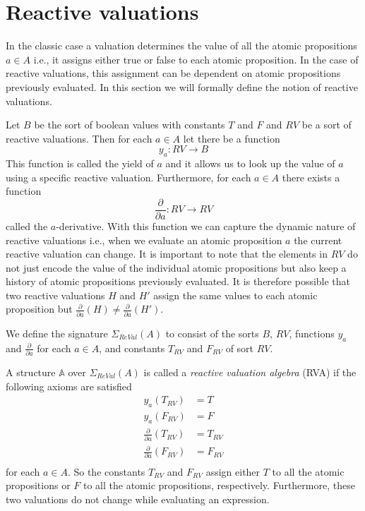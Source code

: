 \documentclass[a4paper,twoside,openright]{report}
\newcommand{\dd}[1]{\frac{\partial}{\partial #1}}
\begin{document}
\section{Reactive valuations}
In the classic case a valuation determines the value of all the atomic propositions $a\in A$ i.e., it assigns either true or false to each atomic proposition. In the case of reactive valuations, this assignment can be dependent on atomic propositions previously evaluated. In this section we will formally define the notion of reactive valuations.

Let $B$ be the sort of boolean values with constants $T$ and $F$ and $RV$ be a sort of reactive valuations. Then for each $a\in A$ let there be a function
\[
y_a:RV\to B
\]
This function is called the yield of $a$ and it allows us to look up the value of $a$ using a specific reactive valuation. Furthermore, for each $a\in A$ there exists a function
\[
\dd a:RV\to RV
\]
called the $a$-derivative. With this function we can capture the dynamic nature of reactive valuations i.e., when we evaluate an atomic proposition $a$ the current reactive valuation can change. It is important to note that the elements in $RV$ do not just encode the value of the individual atomic propositions but also keep a history of atomic propositions previously evaluated. It is therefore possible that two reactive valuations $H$ and $H'$ assign the same values to each atomic proposition but $\dd a(H)\ne \dd a(H')$.

We define the signature $\Sigma_{ReVal}(A)$ to consist of the sorts $B$, $RV$, functions $y_a$ and $\dd a$ for each $a\in A$, and constants $T_{RV}$ and $F_{RV}$ of sort $RV$.

A structure $\mathbb{A}$ over $\Sigma_{ReVal}(A)$ is called a \emph{reactive valuation algebra} (RVA) if the following axioms are satisfied
\begin{align*}
y_a(T_{RV}) &= T\\
y_a(F_{RV}) &= F\\
\dd a(T_{RV}) &= T_{RV}\\
\dd a(F_{RV}) &= F_{RV}\\
\end{align*}
for each $a\in A$. So the constants $T_{RV}$ and $F_{RV}$ assign either $T$ to all the atomic propositions or $F$ to all the atomic propositions, respectively. Furthermore, these two valuations do not change while evaluating an expression.
\end{document}
